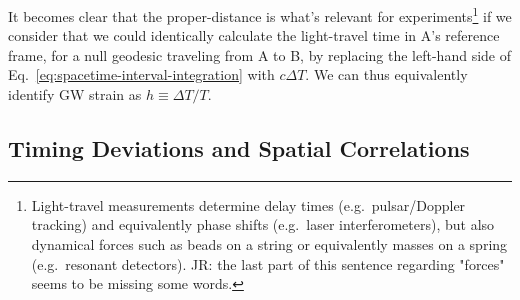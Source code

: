 \documentclass[onecolumn,authoryear]{els-mrw}
\begin{document}
It becomes clear that the proper-distance is what's relevant for experiments\footnote{Light-travel measurements determine delay times (e.g.~pulsar/Doppler tracking) and equivalently phase shifts (e.g.~laser interferometers), but also dynamical forces such as beads on a string or equivalently masses on a spring (e.g.~resonant detectors).  {\color{red}JR: the last part of this sentence regarding "forces" seems to be missing some words.}} if we consider that we could identically calculate the light-travel time in A's reference frame, for a null geodesic traveling from A to B, by replacing the left-hand side of Eq.~\ref{eq:spacetime-interval-integration} with $c \Delta T$.  We can thus equivalently identify GW strain as \mbox{$h \equiv \Delta T / T$}.

\subsection{Timing Deviations and Spatial Correlations}\label{sec:timing-deviations-spatial-correlations}

\end{document}
